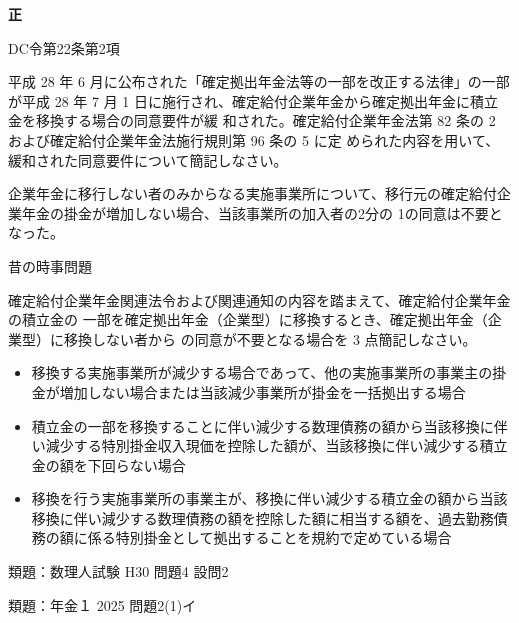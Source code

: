 \begin{answerbox}
  \textbf{正}

\end{answerbox}


\begin{explanationbox}
  DC令第22条第2項
\end{explanationbox}

\begin{shortanswer}[年金1 H28 問題2(3)]
  平成 28 年 6 月に公布された「確定拠出年金法等の一部を改正する法律」の一部が平成 28 年 7
月 1 日に施行され、確定給付企業年金から確定拠出年金に積立金を移換する場合の同意要件が緩
和された。確定給付企業年金法第 82 条の 2 および確定給付企業年金法施行規則第 96 条の 5 に定
められた内容を用いて、緩和された同意要件について簡記しなさい。
\end{shortanswer}

\begin{answerbox}
  企業年金に移行しない者のみからなる実施事業所について、移行元の確定給付企業年金の掛金が増加しない場合、当該事業所の加入者の2分の 1の同意は不要となった。
\end{answerbox}

\begin{explanationbox}
  昔の時事問題
\end{explanationbox}

\begin{shortanswer}[年金2 2019 問題2(2)]
  確定給付企業年金関連法令および関連通知の内容を踏まえて、確定給付企業年金の積立金の
一部を確定拠出年金（企業型）に移換するとき、確定拠出年金（企業型）に移換しない者から
の同意が不要となる場合を 3 点簡記しなさい。
\end{shortanswer}

\begin{itemize}
  \item 移換する実施事業所が減少する場合であって、他の実施事業所の事業主の掛金が増加しない場合または当該減少事業所が掛金を一括拠出する場合
  \item 積立金の一部を移換することに伴い減少する数理債務の額から当該移換に伴い減少する特別掛金収入現価を控除した額が、当該移換に伴い減少する積立金の額を下回らない場合
  \item 移換を行う実施事業所の事業主が、移換に伴い減少する積立金の額から当該移換に伴い減少する数理債務の額を控除した額に相当する額を、過去勤務債務の額に係る特別掛金として拠出することを規約で定めている場合
\end{itemize}


\begin{explanationbox}
  類題：数理人試験 H30 問題4 設問2

類題：年金１ 2025 問題2(1)イ
\end{explanationbox}

